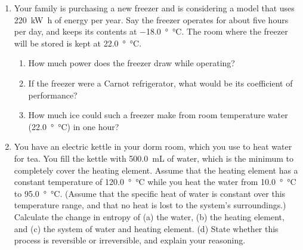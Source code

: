 \documentclass[11pt]{article}
\begin{document}
\begin{enumerate}

\newcommand{\energy}{\SI{220}{\kilo\watt\hour}}
\newcommand{\foodtemp}{\SI{-18.0}{\degree\celsius}}
\newcommand{\roomtemp}{\SI{22.0}{\degree\celsius}}


\item Your family is purchasing a new freezer and is considering a model that uses {\energy} of energy per year.  Say the freezer operates for about five hours per day, and keeps its contents at {\foodtemp}.  The room where the freezer will be stored is kept at {\roomtemp}.

\begin{enumerate}
	\item How much power does the freezer draw while operating?
	\item If the freezer were a Carnot refrigerator, what would be its coefficient of performance?
	\item How much ice could such a freezer make from room temperature water ({\roomtemp}) in one hour?
\end{enumerate}


\bigskip


\newcommand{\vol}{\SI{500.0}{\milli\liter}}
\newcommand{\eltemp}{\SI{120.0}{\degree\celsius}}
\newcommand{\cooltemp}{\SI{10.0}{\degree\celsius}}
\newcommand{\hottemp}{\SI{95.0}{\degree\celsius}}


\item You have an electric kettle in your dorm room, which you use to heat water for tea.  You fill the kettle with {\vol} of water, which is the minimum to completely cover the heating element.  Assume that the heating element has a constant temperature of {\eltemp} while you heat the water from {\cooltemp} to {\hottemp}.  (Assume that the specific heat of water is constant over this temperature range, and that no heat is lost to the system's surroundings.)  Calculate the change in entropy of (a) the water, (b) the heating element, and (c) the system of water and heating element.  (d) State whether this process is reversible or irreversible, and explain your reasoning.

\end{enumerate}
\end{document}
